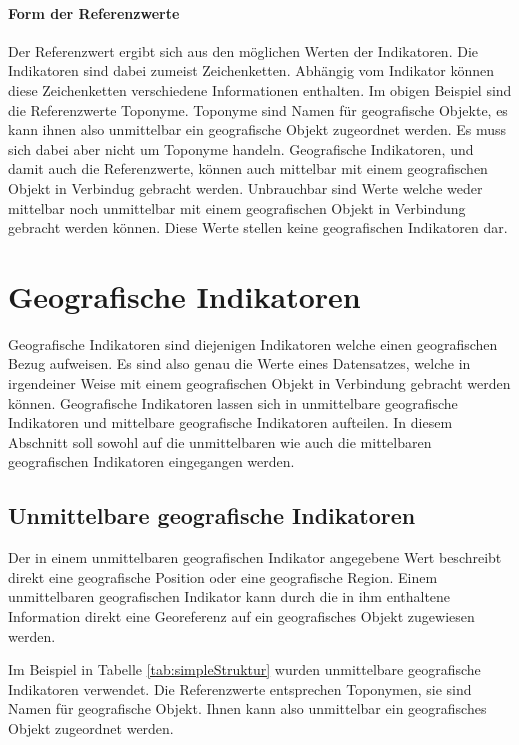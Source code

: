 			\paragraph{Form der Referenzwerte}

				Der Referenzwert ergibt sich aus den möglichen Werten der Indikatoren.
				Die Indikatoren sind dabei zumeist Zeichenketten.
				Abhängig vom Indikator können diese Zeichenketten verschiedene Informationen enthalten.
				Im obigen Beispiel sind die Referenzwerte Toponyme.
				Toponyme sind Namen für geografische Objekte, es kann ihnen also unmittelbar ein geografische Objekt zugeordnet werden.
				Es muss sich dabei aber nicht um Toponyme handeln.
				Geografische Indikatoren, und damit auch die Referenzwerte, können auch mittelbar mit einem geografischen Objekt in Verbindug gebracht werden.
				Unbrauchbar sind Werte welche weder mittelbar noch unmittelbar mit einem geografischen Objekt in Verbindung gebracht werden können.
				Diese Werte stellen keine geografischen Indikatoren dar.

	\section{Geografische Indikatoren} 

		Geografische Indikatoren sind diejenigen Indikatoren welche einen geografischen Bezug aufweisen.
		Es sind also genau die Werte eines Datensatzes, welche in irgendeiner Weise mit einem geografischen Objekt in Verbindung gebracht werden können.
		Geografische Indikatoren lassen sich in unmittelbare geografische Indikatoren und mittelbare geografische Indikatoren aufteilen. 
		In diesem Abschnitt soll sowohl auf die unmittelbaren wie auch die mittelbaren geografischen Indikatoren eingegangen werden.

			\subsection{Unmittelbare geografische Indikatoren} \label{subsec:unmittelbareGeografischeIndikatoren} 

				Der in einem unmittelbaren geografischen Indikator angegebene Wert beschreibt direkt eine geografische Position oder eine geografische Region.	
				Einem unmittelbaren geografischen Indikator kann durch die in ihm enthaltene Information direkt eine Georeferenz auf ein geografisches Objekt zugewiesen werden. 

				Im Beispiel in Tabelle \ref{tab:simpleStruktur} wurden unmittelbare geografische Indikatoren verwendet.
				Die Referenzwerte entsprechen Toponymen, sie sind Namen für geografische Objekt. 
				Ihnen kann also unmittelbar ein geografisches Objekt zugeordnet werden.

